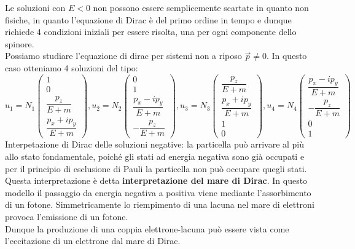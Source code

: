 Le soluzioni con $E<0$ non possono essere semplicemente scartate in quanto non fisiche, in quanto l'equazione di Dirac è del primo ordine in tempo e dunque richiede 4 condizioni iniziali per essere risolta, una per ogni componente dello spinore.\\
Possiamo studiare l'equazione di dirac per sistemi non a riposo $\vec{p} \neq 0$. In questo caso otteniamo 4 soluzioni del tipo:
\begin{equation}
    u_1 = N_1\begin{pmatrix}
      1 \\[8pt] 0 \\[8pt] \dfrac{p_z}{E+m} \\[8pt] \dfrac{p_x + ip_y}{E+m}
    \end{pmatrix},
    u_2 = N_2\begin{pmatrix}
      0 \\[8pt] 1 \\[8pt] \dfrac{p_x - ip_y}{E+m} \\[8pt] -\dfrac{p_z}{E+m}
    \end{pmatrix},
    u_3 = N_3\begin{pmatrix}
      \dfrac{p_z}{E+m} \\[8pt] \dfrac{p_x + ip_y}{E+m} \\[8pt] 1 \\[8pt] 0
    \end{pmatrix},
    u_4 = N_4\begin{pmatrix}
      \dfrac{p_x - ip_y}{E+m} \\[8pt] -\dfrac{p_z}{E+m} \\[8pt] 0 \\[8pt] 1
    \end{pmatrix}
\end{equation}
Interpetazione di Dirac delle soluzioni negative: la particella può arrivare al più allo stato fondamentale, poiché gli stati ad energia negativa sono già occupati e per il principio di esclusione di Pauli la particella non può occupare quegli stati.\\
Questa interpretazione è detta \textbf{interpretazione del mare di Dirac}. In questo modello il passaggio da energia negativa a positiva viene mediante l'assorbimento di un fotone. Simmetricamente lo riempimento di una lacuna nel mare di elettroni provoca l'emissione di un fotone.\\
Dunque la produzione di una coppia elettrone-lacuna può essere vista come l'eccitazione di un elettrone dal mare di Dirac.\\
